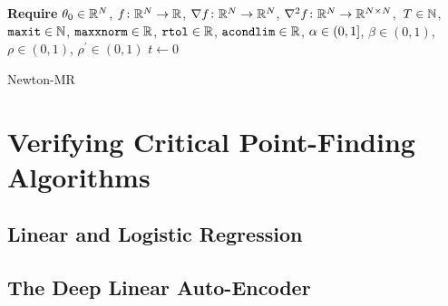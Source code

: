 \documentclass[../../thesis.tex]{subfiles}
\begin{document}
\begin{algorithm}[H]
    \SetAlgoLined{}
    \textbf{Require}
    $\theta_0 \in \mathbb{R}^N$,
    $f\colon\mathbb{R}^N\to\mathbb{R}$,
    $\nabla{f}\colon\mathbb{R}^N\to\mathbb{R}^N$,
    $\nabla^2{f}\colon\mathbb{R}^N\to\mathbb{R}^{N\times N}$,\
    $T\in \mathbb{N}$,\\
    $\texttt{maxit} \in \mathbb{N}$,
    $\texttt{maxxnorm} \in \mathbb{R}$,
    $\texttt{rtol} \in \mathbb{R}$,
    $\texttt{acondlim} \in \mathbb{R}$,
    $\alpha \in \intervaloc{0}{1}$,
    $\beta \in (0, 1)$,
    $\rho \in (0, 1)$,
    $\rho^\prime \in (0, 1)$
    $t \leftarrow 0$\\
    \caption{Newton-MR}
\end{algorithm}

\section{Verifying Critical Point-Finding Algorithms}

\subsection{Linear and Logistic Regression}

\subsection{The Deep Linear Auto-Encoder}

\onlyinsubfile{\printbibliography}
\end{document}
